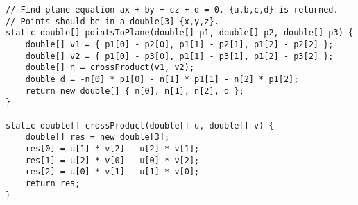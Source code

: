 \begin{verbatim}
// Find plane equation ax + by + cz + d = 0. {a,b,c,d} is returned.
// Points should be in a double[3] {x,y,z}.
static double[] pointsToPlane(double[] p1, double[] p2, double[] p3) {
	double[] v1 = { p1[0] - p2[0], p1[1] - p2[1], p1[2] - p2[2] };
	double[] v2 = { p1[0] - p3[0], p1[1] - p3[1], p1[2] - p3[2] };
	double[] n = crossProduct(v1, v2);
	double d = -n[0] * p1[0] - n[1] * p1[1] - n[2] * p1[2];
	return new double[] { n[0], n[1], n[2], d };
}

static double[] crossProduct(double[] u, double[] v) {
	double[] res = new double[3];
	res[0] = u[1] * v[2] - u[2] * v[1];
	res[1] = u[2] * v[0] - u[0] * v[2];
	res[2] = u[0] * v[1] - u[1] * v[0];
	return res;
}
\end{verbatim}